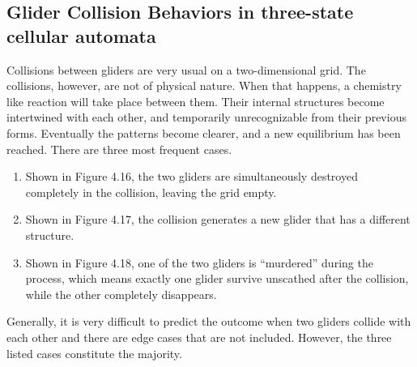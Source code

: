 \documentclass[12pt]{article}
\numberwithin{figure}{section} %
\begin{document}
\subsection{Glider Collision Behaviors in three-state cellular automata}
Collisions between gliders are very usual on a two-dimensional grid. The collisions, however, are not of physical nature. When that happens, a chemistry like reaction will take place between them. Their internal structures become intertwined with each other, and temporarily unrecognizable from their previous forms. Eventually the patterns become clearer, and a new equilibrium has been reached. There are three most frequent cases. 
\begin{enumerate}[topsep=0pt,itemsep=-1ex,partopsep=1ex,parsep=1ex]
\item Shown in Figure 4.16, the two gliders are simultaneously destroyed completely in the collision, leaving the grid empty. 
\item Shown in Figure 4.17, the collision generates a new glider that has a different structure. 
\item Shown in Figure 4.18, one of the two gliders is “murdered” during the process, which means exactly one glider survive unscathed after the collision, while the other completely disappears.
\end{enumerate}
Generally, it is very difficult to predict the outcome when two gliders collide with each other and there are edge cases that are not included. However, the three listed cases constitute the majority. 
\end{document}
